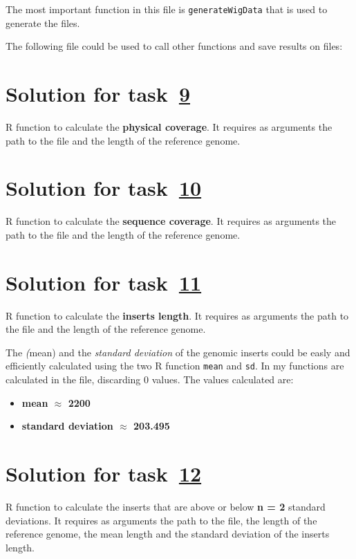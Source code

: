 The most important function in this file is \texttt{generateWigData} that is
used to generate the  files.

The following  file could be used to call other functions and
save results on  files:


\section{Solution for task~\hyperref[itm:2.9]{9}}
R function to calculate the \textbf{physical coverage}. It requires as arguments
the path to the  file and the length of the reference genome.
\scriptusage


\section{Solution for task~\hyperref[itm:2.10]{10}}
R function to calculate the \textbf{sequence coverage}. It requires as arguments
the path to the  file and the length of the reference genome.
\scriptusage


\section{Solution for task~\hyperref[itm:2.11]{11}}
R function to calculate the \textbf{inserts length}. It requires as arguments
the path to the  file and the length of the reference genome.
\scriptusage


The \textit(mean) and the \textit{standard deviation} of the genomic inserts 
could be easly and efficiently calculated using the two R function \texttt{mean}
and \texttt{sd}. In my functions are calculated in the  file,
discarding 0 values. The values calculated are:
\begin{itemize}
    \item \textbf{mean $\approx$ 2200}
    \item \textbf{standard deviation $\approx$ 203.495}
\end{itemize}

\section{Solution for task~\hyperref[itm:2.12]{12}}
R function to calculate the inserts that are above or below \textbf{n = 2}
standard deviations. It requires as arguments the path to the  file,
the length of the reference genome, the mean length and the standard deviation
of the inserts length.
\scriptusage


